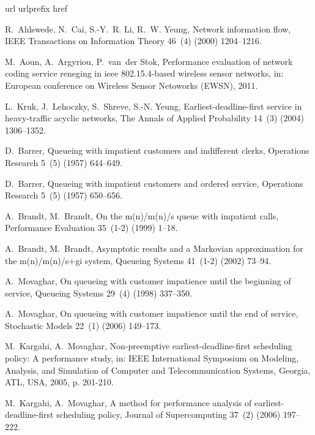 \documentclass[preprint,12pt]{elsarticle}
\theoremstyle{definition}
\theoremstyle{plain}
\theoremstyle{remark}
\begin{document}
\begin{thebibliography}{100}
\expandafter\ifx\csname url\endcsname\relax
  \def\url#1{\texttt{#1}}\fi
\expandafter\ifx\csname urlprefix\endcsname\relax\def\urlprefix{URL }\fi
\expandafter\ifx\csname href\endcsname\relax
  \def\href#1#2{#2} \def\path#1{#1}\fi

R.~Ahlswede, N.~Cai, S.-Y.~R. Li, R.~W. Yeung, Network information flow, IEEE
  Transactions on Information Theory 46~(4) (2000) 1204--1216.

M.~Aoun, A.~Argyriou, P.~van~der Stok, Performance evaluation of network coding
  service reneging in ieee 802.15.4-based wireless sensor networks, in:
  European conference on Wireless Sensor Netoworks (EWSN), 2011.

L.~Kruk, J.~Lehoczky, S.~Shreve, S.-N. Yeung, Earliest-deadline-first service
  in heavy-traffic acyclic networks, The Annals of Applied Probability 14~(3)
  (2004) 1306--1352.

D.~Barrer, {Q}ueueing with impatient customers and indifferent clerks,
  Operations Research 5~(5) (1957) 644--649.

D.~Barrer, {Q}ueueing with impatient customers and ordered service, Operations
  Research 5~(5) (1957) 650--656.

A.~Brandt, M.~Brandt, On the m(n)/m(n)/s queue with impatient calls,
  Performance Evaluation 35~(1-2) (1999) 1--18.

A.~Brandt, M.~Brandt, Asymptotic results and a {M}arkovian approximation for
  the m(n)/m(n)/s+gi system, Queueing Systems 41~(1-2) (2002) 73--94.

A.~Movaghar, On queueing with customer impatience until the beginning of
  service, Queueing Systems 29~(4) (1998) 337--350.

A.~Movaghar, On queueing with customer impatience until the end of service,
  Stochastic Models 22~(1) (2006) 149--173.

M.~Kargahi, A.~Movaghar, Non-preemptive earliest-deadline-first scheduling
  policy: A performance study, in: IEEE International Symposium on Modeling,
  Analysis, and Simulation of Computer and Telecommunication Systems, Georgia,
  ATL, USA, 2005, p. 201-210.

M.~Kargahi, A.~Movaghar, A method for performance analysis of
  earliest-deadline-first scheduling policy, Journal of Supercomputing 37~(2)
  (2006) 197--222.


\end{thebibliography}
\end{document}
